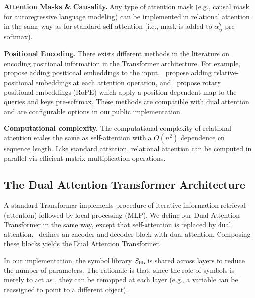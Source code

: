 \textbf{Attention Masks \& Causality.} Any type of attention mask (e.g., causal mask for autoregressive language modeling) can be implemented in relational attention in the same way as for standard self-attention (i.e., mask is added to $\alpha_{ij}^h$ pre-softmax).

\textbf{Positional Encoding.} There exists different methods in the literature on encoding positional information in the Transformer architecture. For example,~\citet{vaswani2017attention} propose adding positional embeddings to the input,~\citet{shawSelfAttentionRelativePosition2018b} propose adding relative-positional embeddings at each attention operation, and~\citet{suRoFormerEnhancedTransformer2023} propose rotary positional embeddings (RoPE) which apply a position-dependent map to the queries and keys pre-softmax. These methods are compatible with dual attention and are configurable options in our public implementation.

\textbf{Computational complexity.} The computational complexity of relational attention scales the same as self-attention with a $O(n^2)$ dependence on sequence length. Like standard attention, relational attention can be computed in parallel via efficient matrix multiplication operations.

\subsection{The Dual Attention Transformer Architecture}

A standard Transformer implements procedure of iterative information retrieval (attention) followed by local processing (MLP). We define our Dual Attention Transformer in the same way, except that self-attention is replaced by dual attention.~ defines an encoder and decoder block with dual attention. Composing these blocks yields the Dual Attention Transformer.

\begin{remark}
    In our implementation, the symbol library $S_\mathrm{lib}$ is shared across layers to reduce the number of parameters. 
    The rationale is that, since the role of symbols is merely to act as , they can be remapped at each layer (e.g., a variable can be reassigned to point to a different object).
\end{remark}

